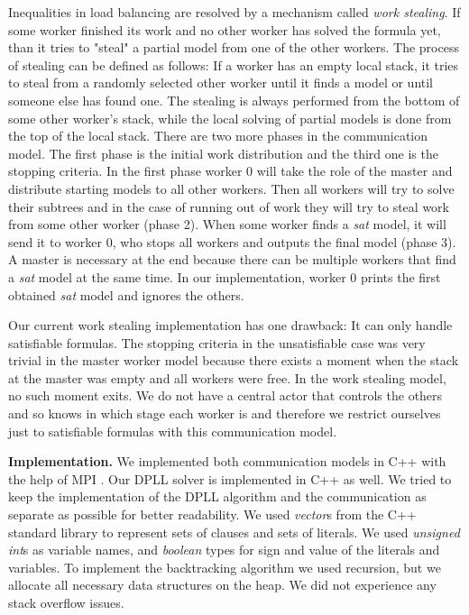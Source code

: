 \documentclass[letterpaper]{article}
\newcommand{\mypar}[1]{{\bf #1.}}
\begin{document}
Inequalities in load balancing are resolved by a mechanism called \textit{work stealing}.
If some worker finished its work and no other worker has solved the formula yet, than it tries to "steal" a partial model from one of the other workers.
The process of stealing can be defined as follows:
If a worker has an empty local stack, it tries to steal from a randomly selected other worker until it finds a model or until someone else has found one.
The stealing is always performed from the bottom of some other worker's stack, while the local solving of partial models is done from the top of the local stack.
There are two more phases in the communication model.
The first phase is the initial work distribution and the third one is the stopping criteria.
In the first phase worker 0 will take the role of the master and distribute starting models to all other workers.
Then all workers will try to solve their subtrees and in the case of running out of work they will try to steal work from some other worker (phase 2).
When some worker finds a \textit{sat} model, it will send it to worker 0, who stops all workers and outputs the final model (phase 3).
A master is necessary at the end because there can be multiple workers that find a \textit{sat} model at the same time.
In our implementation, worker 0 prints the first obtained \textit{sat} model and ignores the others.

Our current work stealing implementation has one drawback:
It can only handle satisfiable formulas.
The stopping criteria in the unsatisfiable case was very trivial in the master worker model because there exists a moment when the stack at the master was empty and all workers were free.
In the work stealing model, no such moment exits.
We do not have a central actor that controls the others and so knows in which stage each worker is and therefore we restrict ourselves just to satisfiable formulas with this communication model.

\mypar{Implementation}
We implemented both communication models in C++ with the help of MPI \cite{mpi}.
Our DPLL solver is implemented in C++ as well.
We tried to keep the implementation of the DPLL algorithm and the communication as separate as possible for better readability.
We used \textit{vector}s from the C++ standard library to represent sets of clauses and sets of literals.
We used \textit{unsigned int}s as variable names, and \textit{boolean} types for sign and value of the literals and variables.
To implement the backtracking algorithm we used recursion, but we allocate all necessary data structures on the heap.
We did not experience any stack overflow issues.
\end{document}
